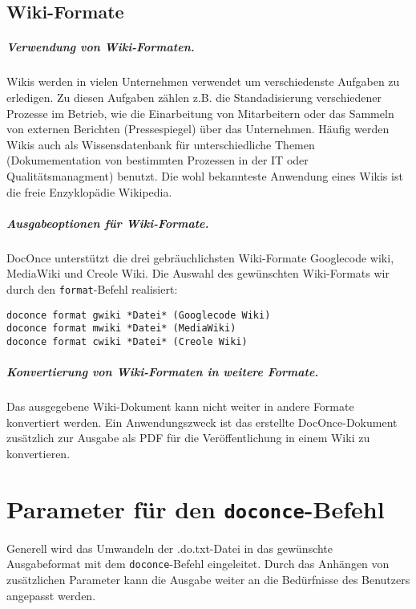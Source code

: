 \documentclass[%
oneside,                 %
final,                   %
chapterprefix=true,      %
open=right,              %
10pt]{book}
\begin{document}
\noindent
\section{Wiki-Formate}
\paragraph{ Verwendung von Wiki-Formaten.}
Wikis werden in vielen Unternehmen verwendet um verschiedenste Aufgaben zu erledigen. Zu diesen Aufgaben zählen z.B. die Standadisierung verschiedener Prozesse im Betrieb, wie die Einarbeitung von Mitarbeitern oder das Sammeln von externen Berichten (Pressespiegel) über das Unternehmen. Häufig werden Wikis auch als Wissensdatenbank für unterschiedliche Themen (Dokumementation von bestimmten Prozessen in der IT oder Qualitätsmanagment) benutzt. Die wohl bekannteste Anwendung eines Wikis ist die freie Enzyklopädie Wikipedia.
\paragraph{ Ausgabeoptionen für Wiki-Formate.}
DocOnce unterstützt die drei gebräuchlichsten Wiki-Formate Googlecode wiki, MediaWiki und Creole Wiki. Die Auswahl des gewünschten Wiki-Formats wir durch den \texttt{format}-Befehl realisiert:

\begin{verbatim}
doconce format gwiki *Datei* (Googlecode Wiki)
doconce format mwiki *Datei* (MediaWiki)
doconce format cwiki *Datei* (Creole Wiki)
\end{verbatim}
\paragraph{ Konvertierung von Wiki-Formaten in weitere Formate.}
Das ausgegebene Wiki-Dokument kann nicht weiter in andere Formate konvertiert werden. Ein Anwendungszweck ist das erstellte DocOnce-Dokument zusätzlich zur Ausgabe als PDF für die Veröffentlichung in einem Wiki zu konvertieren.
\chapter{Parameter für den \texttt{doconce}-Befehl}
Generell wird das Umwandeln der \*.do.txt-Datei in das gewünschte Ausgabeformat mit dem \texttt{doconce}-Befehl eingeleitet. Durch das Anhängen von zusätzlichen Parameter kann die Ausgabe weiter an die Bedürfnisse des Benutzers angepasst werden.
\end{document}
